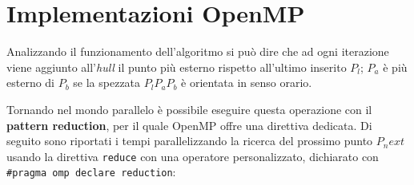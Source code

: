 \section{Implementazioni OpenMP}
Analizzando il funzionamento dell'algoritmo si può dire che ad ogni iterazione viene aggiunto all'\emph{hull} il punto più esterno rispetto all'ultimo inserito $P_l$;
$P_a$ è più esterno di $P_b$ se la spezzata $P_lP_aP_b$ è orientata in senso orario.

Tornando nel mondo parallelo è possibile eseguire questa operazione con il \textbf{pattern reduction}, per il quale OpenMP offre una direttiva dedicata.
Di seguito sono riportati i tempi parallelizzando la ricerca del prossimo punto $P_next$ usando la direttiva \texttt{reduce} con una operatore personalizzato,
dichiarato con \texttt{\#pragma omp declare reduction}:

